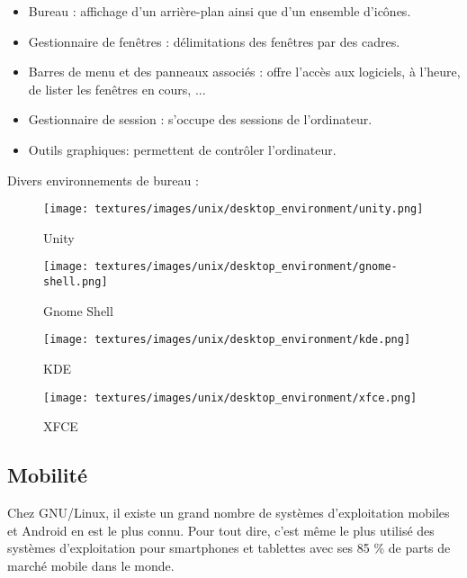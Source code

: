 \begin{itemize}
\item Bureau : affichage d'un arrière-plan ainsi que d'un ensemble d'icônes. \\

\item Gestionnaire de fenêtres : délimitations des fenêtres par des cadres. \\

\item Barres de menu et des panneaux associés : offre l'accès aux logiciels, à
l'heure, de lister les fenêtres en cours, ... \\

\item Gestionnaire de session : s'occupe des sessions de l'ordinateur. \\

\item Outils graphiques: permettent de contrôler l'ordinateur. \\
\end{itemize}

Divers environnements de bureau : \\

\begin{figure}[!htb]
  \texttt{[image: textures/images/unix/desktop\_environment/unity.png]}
  \caption{Unity}\label{fig:unity}
  \endminipage\hfill
  \texttt{[image: textures/images/unix/desktop\_environment/gnome-shell.png]}
  \caption{Gnome Shell}\label{fig:gnome shell}
  \endminipage
\end{figure}

\begin{figure}[!htb]
  \texttt{[image: textures/images/unix/desktop\_environment/kde.png]}
  \caption{KDE}\label{fig:kde}
  \endminipage\hfill
  \texttt{[image: textures/images/unix/desktop\_environment/xfce.png]}
  \caption{XFCE}\label{fig:xfce}
  \endminipage
\end{figure}

\newpage

\subsection{Mobilité}
Chez GNU/Linux, il existe un grand nombre de systèmes d’exploitation mobiles et
Android en est le plus connu. Pour tout dire, c'est même le plus utilisé des
systèmes d'exploitation pour smartphones et tablettes avec ses 85 \% de parts de
marché mobile dans le monde. \\

